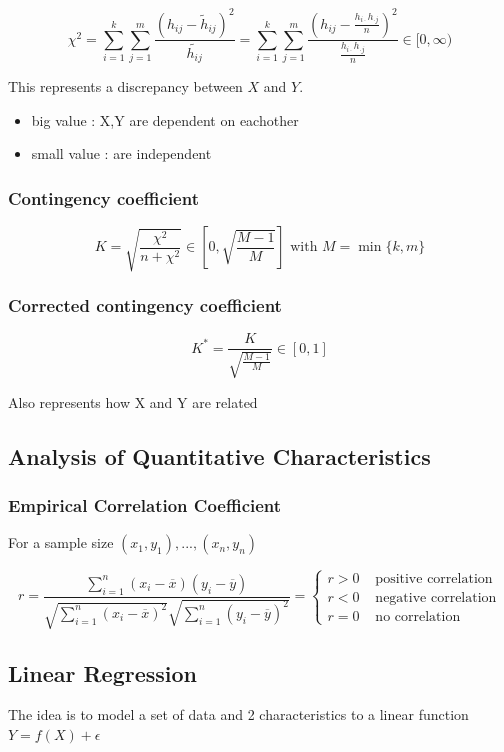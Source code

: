 \documentclass{article}
\begin{document}
\[\chi^2 = \sum_{i=1}^k\sum_{j=1}^m\frac{(h_{ij} - \tilde{h}_{ij})^2}{\tilde{h_{ij}}} = \sum_{i=1}^k\sum_{j=1}^m\frac{(h_{ij} - \frac{h_{i\cdot}h_{\cdot j}}{n})^2}{\frac{h_{i\cdot}h_{\cdot j}}{n}} \in [0,\infty)\]

This represents a discrepancy between $X$ and $Y$.
\begin{itemize}
    \item big value : X,Y are dependent on eachother
    \item small value : are independent
\end{itemize}

\subsubsection{Contingency coefficient} 

\[K = \sqrt{\frac{\chi^2}{n+\chi^2}} \in \left[0,\sqrt{\frac{M-1}{M}} \right] \text{ with } M = \min\{k,m\}\]

\subsubsection{Corrected contingency coefficient} 

\[K^* = \frac{K}{\sqrt{\frac{M-1}{M}}} \in [0,1]\]

Also represents how X and Y are related

\subsection{Analysis of Quantitative Characteristics}

\subsubsection{Empirical Correlation Coefficient}

For a sample size $(x_1,y_1),...,(x_n,y_n)$

\[r =  \frac{\sum_{i=1}^n (x_i - \overline{x})(y_i - \overline{y})}{\sqrt{\sum_{i=1}^n(x_i - \overline{x})^2} \sqrt{\sum_{i=1}^n(y_i - \overline{y})^2}}=\begin{cases}
    r > 0 & \text{ positive correlation}\\
    r < 0 & \text{ negative correlation}\\
    r = 0 & \text{ no correlation}
\end{cases}\]

\subsection{Linear Regression}
The idea is to model a set of data and 2 characteristics to a linear function $Y = f(X) + \epsilon$
\end{document}
